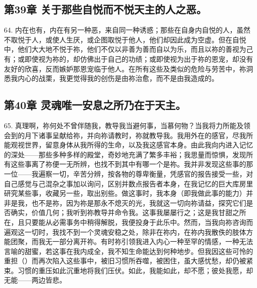 
\subsection{第39章 关于那些自悦而不悦天主的人之恶。}

64. 内在也有，内在有另一种恶，来自同一种诱惑；那些在自身内自悦的人，虽然不取悦于人，或使人生厌，或企图取悦于他人，他们却因此成为空虚。但在自悦中，他们大大地不悦于祢，他们不仅以非善为善而自以为乐，而且以祢的善视为己有；或即使视为祢的，却仿佛出于自己的功绩；或即使视为出于祢的恩宠，却没有友好的欣喜，反而嫉妒那恩宠临于他人。在所有这些及类似的危险与劳苦中，祢洞悉我内心的战栗，我更觉得我的创伤是由祢治愈，而不是由我造成的。\par


\subsection{第40章 灵魂唯一安息之所乃在于天主。}

65. 真理啊，祢何处不曾伴随我，教导我当避何事，当慕何物？当我将力所能及领会到的月下诸事呈献给祢，并向祢请教时，祢就教导我。我用外在的感官，尽我所能观视世界，留意身体从我所得的生命，以及我这感官本身。由此我向内进入记忆的深处——那些多种多样的殿堂，奇妙地充满了繁多丰裕；我思量而惊惧，发现所有这些事离了祢便一无所辨，也找不到其中有哪一个是祢。我并非发现这些事的那一位——我遍察一切，辛苦分辨，按各物的尊卑衡量，凭感官的报告接受一些，对自己感觉与己混杂之事加以询问，区别并数点报告者本身，在我记忆的巨大库房里研究某些事，收藏另一些，取出别些。做这事时，我本身（即我做此事的能力）并非是我，也不是祢，因为祢是那永不熄灭的光，我就这一切向祢请益，探究它们是否确实，价值几何；我听到祢教导并命令我。这事我屡屡行之；这是我甘甜之所在，且只要能从必需事务中稍得解脱，我便投身于此乐中。然而，当我向祢咨询而遍观这一切时，我找不到一个灵魂安稳之处，除非在祢内，在祢内我散佚的肢体方能团聚，而我无一部分离开祢。有时祢引领我进入内心一种至罕的情感，一种无法言喻的甜蜜，若这事在我内成全，我不知生命能达到何种地步。但我因这些可怜的重担（）而再次陷入这些事中，被旧习惯所吞噬，被困住，虽大感忧愁，却仍被紧束。习惯的重压如此沉重地将我们压伏。如此，我能如此，却不愿；彼处我愿，却无能——两边皆悲。\par


